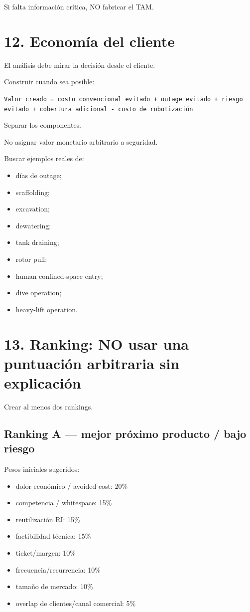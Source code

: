 \documentclass[11pt,a4paper]{article}
\begin{document}
Si falta información crítica, NO fabricar el TAM.


\section*{12. Economía del cliente}
El análisis debe mirar la decisión desde el cliente.

Construir cuando sea posible:

\texttt{Valor creado = costo convencional evitado + outage evitado + riesgo evitado + cobertura adicional - costo de robotización}

Separar los componentes.

No asignar valor monetario arbitrario a seguridad.

Buscar ejemplos reales de:

\begin{itemize}
\item días de outage;
\item scaffolding;
\item excavation;
\item dewatering;
\item tank draining;
\item rotor pull;
\item human confined-space entry;
\item dive operation;
\item heavy-lift operation.
\end{itemize}


\section*{13. Ranking: NO usar una puntuación arbitraria sin explicación}
Crear al menos dos rankings.


\subsection*{Ranking A — mejor próximo producto / bajo riesgo}
Pesos iniciales sugeridos:

\begin{itemize}
\item dolor económico / avoided cost: 20\%
\item competencia / whitespace: 15\%
\item reutilización RI: 15\%
\item factibilidad técnica: 15\%
\item ticket/margen: 10\%
\item frecuencia/recurrencia: 10\%
\item tamaño de mercado: 10\%
\item overlap de clientes/canal comercial: 5\%
\end{itemize}
\end{document}
